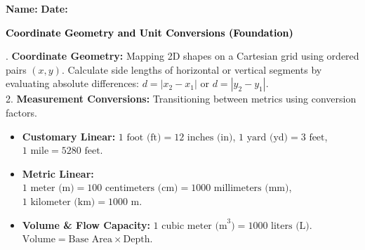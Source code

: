 \documentclass[12pt, letterpaper, fleqn]{article}
\renewcommand{\footrulewidth}{0.2pt}
\begin{document}
\pagestyle{fancy}
\fancyhf{}
\fancyfoot[C]{\thepage}
\renewcommand{\footrulewidth}{0.2pt}

\textbf{Name:} \underline{\hspace{5cm}} \hfill \textbf{Date:} \underline{\hspace{3cm}}\\

\begin{tcolorbox}[colback=black!10]
    \large\textcolor{black}{\textbf{Coordinate Geometry and Unit Conversions (Foundation)}}
\end{tcolorbox}

\vspace{2mm}

. \textbf{Coordinate Geometry:} Mapping 2D shapes on a Cartesian grid using ordered pairs $(x, y)$. Calculate side lengths of horizontal or vertical segments by evaluating absolute differences: $d = |x_2 - x_1|$ or $d = |y_2 - y_1|$.\\
2. \textbf{Measurement Conversions:} Transitioning between metrics using conversion factors.
\begin{itemize}[noitemsep, leftmargin=0.5cm]
    \item \textbf{Customary Linear:} $1\text{ foot (ft)} = 12\text{ inches (in)}$, $1\text{ yard (yd)} = 3\text{ feet}$, $1\text{ mile} = 5280\text{ feet}$.
    \item \textbf{Metric Linear:} $1\text{ meter (m)} = 100\text{ centimeters (cm)} = 1000\text{ millimeters (mm)}$, $1\text{ kilometer (km)} = 1000\text{ m}$.
    \item \textbf{Volume \& Flow Capacity:} $1\text{ cubic meter (m}^3) = 1000\text{ liters (L)}$. $\text{Volume} = \text{Base Area} \times \text{Depth}$.
\end{itemize}

\vspace{2mm}

\begin{center}
\end{center}
\end{document}
